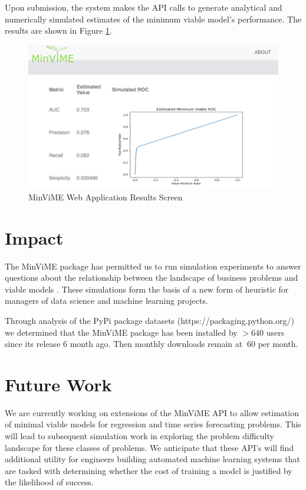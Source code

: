 \documentclass[preprint,12pt, a4paper]{elsarticle}
\begin{document}
Upon submission, the system makes the API calls to generate analytical and
numerically simulated estimates of the minimum viable model's performance. The results
are shown in Figure \ref{screen2}.

\begin{figure}[h!]
\includegraphics[scale=0.5]{images/Screen2.png}
\caption{MinViME Web Application Results Screen}
\label{screen2}
\end{figure}

\section{Impact}

The MinViME package has permitted us to run simulation experiments to answer questions
about the relationship between the landscape of business problems and viable models 
\cite{Hawkins2020}.
These simulations form the basis of a new form of heuristic for managers of data science
and machine learning projects.

Through analysis of the PyPi package datasets (https://packaging.python.org/)
we determined that the MinViME package has been installed 
by $>640$ users since its release 6 month ago. Then monthly downloads remain at $~60$
per month.


\section{Future Work}

We are currently working on extensions of the MinViME API to allow estimation of 
minimal viable models for regression and time series forecasting problems. 
This will lead to subsequent simulation work in exploring the problem difficulty landscape
for these classes of problems. We anticipate that these API's will find additional
utility for engineers building automated machine learning systems that are tasked
with determining whether the cost of training a model is justified by the likelihood
of success.
\end{document}

